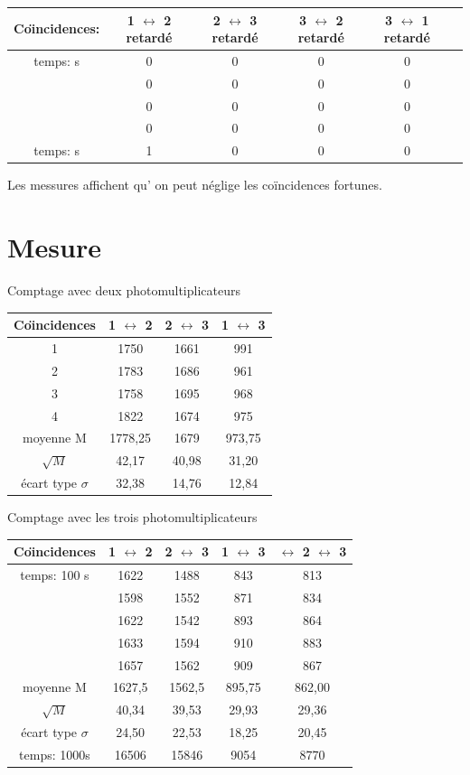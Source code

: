 \documentclass[a4paper,11pt,liststotocnumbered,bibtotocnumbered]{scrartcl}
\begin{document}
  \begin{tabular}{c|c|c|c|c|c}
Co\"{\i}ncidences:	&	1 $\leftrightarrow$ 2 retardé	&	2 $\leftrightarrow$ 3 retardé	&	3 $\leftrightarrow$ 2 retardé	&	3 $\leftrightarrow$ 1 retardé	\\ \hline	

temps:	\unit[10]{s} &	0	&	0	&	0	&	0	\\
	&	0	&	0	&	0	&	0	\\
	&	0	&	0	&	0	&	0	\\
	&	0	&	0	&	0	&	0	\\ \hline
temps: \unit[100]{s}	&	1	&	0	&	0	&	0	\\
\end{tabular}
\newline
Les messures affichent qu' on peut néglige les co\"{i}ncidences fortunes.
 


 \section{Mesure}
\begin{subsection}{Comptage avec deux photomultiplicateurs}
  \begin{tabular}{c|c|c|c}
Co\"{\i}ncidences	&	 1 $\leftrightarrow$ 2	&	2 $\leftrightarrow$ 3	&	 1 $\leftrightarrow$ 3	\\ \hline
1	&	1750	&	1661	&	991	\\
2	&	1783	&	1686	&	961	\\
3	&	1758	&	1695	&	968	\\
4	&	1822	&	1674	&	975	\\ \hline
moyenne M	&	1778,25	&	1679	&	973,75	\\
$\sqrt M$	&	42,17	&	40,98	&	31,20	\\
écart type $\sigma$	&	32,38	&	14,76	&	12,84	\\
\end{tabular}
\end{subsection}
\begin{subsection}{Comptage avec les trois photomultiplicateurs}
\begin{tabular}{c|c|c|c|c}
Co\"{\i}ncidences	&	 1 $\leftrightarrow$ 2	&	 2 $\leftrightarrow$ 3	&	 1 $\leftrightarrow$ 3	&	 $\leftrightarrow$ 2 $\leftrightarrow$ 3	\\ \hline
temps: 100 s	&	1622	&	1488	&	843	&	813	\\
	&	1598	&	1552	&	871	&	834	\\
	&	1622	&	1542	&	893	&	864	\\
	&	1633	&	1594	&	910	&	883	\\
	&	1657	&	1562	&	909	&	867	\\ \hline
moyenne M	&	1627,5	&	1562,5	&	895,75	&	862,00	\\
$\sqrt M$	&	40,34	&	39,53	&	29,93	&	29,36	\\
écart type $\sigma$	&	24,50	&	22,53	&	18,25	&	20,45	\\ \hline
temps: 1000s	&	16506	&	15846	&	9054	&	8770	\\
\end{tabular}
\end{subsection}
 
\end{document}
